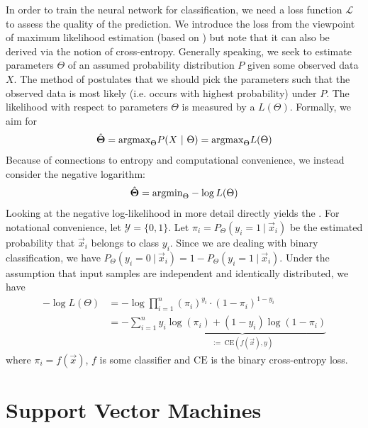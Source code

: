 \documentclass[
	fontsize=10pt, %
	twoside=false, %
	secnumdepth=1, %
  toc=indentunnumbered %
]{kaobook}
\begin{document}
In order to train the neural network for classification, we need a loss function
$\mathcal{L}$ to assess the quality of the prediction. We introduce the
 loss from the viewpoint of maximum likelihood
estimation (based on \cite{zhang_dive_nodate}) but note that it can also be
derived via the notion of cross-entropy.
%
Generally speaking, we seek to estimate parameters $\Theta$ of an assumed
probability distribution $P$ given some observed data $X$. The method of
 postulates that we should pick the
parameters such that the observed data is most likely (i.e. occurs with highest
probability) under $P$. The likelihood with respect to parameters $\Theta$ is measured by
a  $L(\Theta)$.
Formally, we aim for
\begin{align}
  \hat \Theta = \argmax_\Theta P(X~|~\Theta) = \argmax_\Theta L(\Theta)
\end{align}
Because of connections to entropy and computational convenience, we instead
consider the negative logarithm:
\begin{align}
  \hat \Theta = \argmin_\Theta -\log L(\Theta)
\end{align}
Looking at the negative log-likelihood in more detail directly yields the
.
For notational convenience, let $\mathcal{Y} =
\{0,1\}$. Let $\pi_i = P_\Theta(y_i=1~|~\vec x_i)$ be the estimated probability
that $\vec x_i$ belongs to class $y_i$. Since we are dealing with binary
classification, we have $P_\Theta(y_i=0~|~\vec x_i) = 1 - P_\Theta(y_i=1~|~\vec
x_i)$. Under the assumption that input samples are independent and identically
distributed, we have
\begin{align*}
  -\log L(\Theta)  &= -\log \prod_{i=1}^n (\pi_i)^{y_i} \cdot (1-\pi_i)^{1-y_i} \\
                   &= - \sum_{i=1}^n \underbrace{y_i \log(\pi_i) + (1-y_i) \log(1-\pi_i)}_{:=~ \text{CE}(f(\vec x), y)}
    \label{eq:bce-loss-basic}
\end{align*}
where $\pi_i = f(\vec x)$, $f$ is some classifier and $\text{CE}$ is the binary
cross-entropy loss.

\section{Support Vector Machines}
\end{document}
